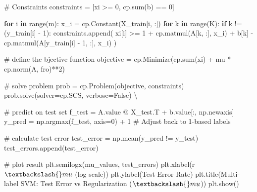\documentclass[
  letterpaper,
  DIV=11,
  numbers=noendperiod]{scrartcl}
\newenvironment{Shaded}{\begin{snugshade}}{\end{snugshade}}
\newcommand{\BuiltInTok}[1]{\textcolor[rgb]{0.00,0.23,0.31}{#1}}
\newcommand{\CommentTok}[1]{\textcolor[rgb]{0.37,0.37,0.37}{#1}}
\newcommand{\ControlFlowTok}[1]{\textcolor[rgb]{0.00,0.23,0.31}{\textbf{#1}}}
\newcommand{\DecValTok}[1]{\textcolor[rgb]{0.68,0.00,0.00}{#1}}
\newcommand{\KeywordTok}[1]{\textcolor[rgb]{0.00,0.23,0.31}{\textbf{#1}}}
\newcommand{\NormalTok}[1]{\textcolor[rgb]{0.00,0.23,0.31}{#1}}
\newcommand{\OperatorTok}[1]{\textcolor[rgb]{0.37,0.37,0.37}{#1}}
\newcommand{\StringTok}[1]{\textcolor[rgb]{0.13,0.47,0.30}{#1}}
\newcommand{\VariableTok}[1]{\textcolor[rgb]{0.07,0.07,0.07}{#1}}
\newcommand{\VerbatimStringTok}[1]{\textcolor[rgb]{0.13,0.47,0.30}{#1}}
\begin{document}
\begin{Shaded}
\begin{Highlighting}[]
    \CommentTok{\# Constraints}
\NormalTok{    constraints }\OperatorTok{=}\NormalTok{ [xi }\OperatorTok{\textgreater{}=} \DecValTok{0}\NormalTok{, cp.}\BuiltInTok{sum}\NormalTok{(b) }\OperatorTok{==} \DecValTok{0}\NormalTok{]}

    \ControlFlowTok{for}\NormalTok{ i }\KeywordTok{in} \BuiltInTok{range}\NormalTok{(m):}
\NormalTok{        x\_i }\OperatorTok{=}\NormalTok{ cp.Constant(X\_train[i, :]) }
        \ControlFlowTok{for}\NormalTok{ k }\KeywordTok{in} \BuiltInTok{range}\NormalTok{(K):}
            \ControlFlowTok{if}\NormalTok{ k }\OperatorTok{!=}\NormalTok{ (y\_train[i] }\OperatorTok{{-}} \DecValTok{1}\NormalTok{):}
\NormalTok{                constraints.append(}
\NormalTok{                    xi[i] }\OperatorTok{\textgreater{}=} \DecValTok{1} \OperatorTok{+}\NormalTok{ cp.matmul(A[k, :], x\_i) }\OperatorTok{+}\NormalTok{ b[k] }\OperatorTok{{-}}\NormalTok{ cp.matmul(A[y\_train[i] }\OperatorTok{{-}} \DecValTok{1}\NormalTok{, :], x\_i)}
\NormalTok{                )}

    \CommentTok{\# define the bjective function}
\NormalTok{    objective }\OperatorTok{=}\NormalTok{ cp.Minimize(cp.}\BuiltInTok{sum}\NormalTok{(xi) }\OperatorTok{+}\NormalTok{ mu }\OperatorTok{*}\NormalTok{ cp.norm(A, }\StringTok{\textquotesingle{}fro\textquotesingle{}}\NormalTok{)}\OperatorTok{**}\DecValTok{2}\NormalTok{)}

    \CommentTok{\# solve problem}
\NormalTok{    prob }\OperatorTok{=}\NormalTok{ cp.Problem(objective, constraints)}
\NormalTok{    prob.solve(solver}\OperatorTok{=}\NormalTok{cp.SCS, verbose}\OperatorTok{=}\VariableTok{False}\NormalTok{)  }\OperatorTok{\textbackslash{}}

    \CommentTok{\# predict on test set}
\NormalTok{    f\_test }\OperatorTok{=}\NormalTok{ A.value }\OperatorTok{@}\NormalTok{ X\_test.T }\OperatorTok{+}\NormalTok{ b.value[:, np.newaxis]}
\NormalTok{    y\_pred }\OperatorTok{=}\NormalTok{ np.argmax(f\_test, axis}\OperatorTok{=}\DecValTok{0}\NormalTok{) }\OperatorTok{+} \DecValTok{1}  \CommentTok{\# Adjust back to 1{-}based labels}

    \CommentTok{\# calculate test error}
\NormalTok{    test\_error }\OperatorTok{=}\NormalTok{ np.mean(y\_pred }\OperatorTok{!=}\NormalTok{ y\_test)}
\NormalTok{    test\_errors.append(test\_error)}

\CommentTok{\# plot result}
\NormalTok{plt.semilogx(mu\_values, test\_errors)}
\NormalTok{plt.xlabel(}\VerbatimStringTok{r\textquotesingle{}$\textbackslash{}mu$ (log scale)\textquotesingle{}}\NormalTok{)}
\NormalTok{plt.ylabel(}\StringTok{\textquotesingle{}Test Error Rate\textquotesingle{}}\NormalTok{)}
\NormalTok{plt.title(}\StringTok{\textquotesingle{}Multi{-}label SVM: Test Error vs Regularization ($\textbackslash{}mu$)\textquotesingle{}}\NormalTok{)}
\NormalTok{plt.show()}
\end{Highlighting}
\end{Shaded}
\end{document}
